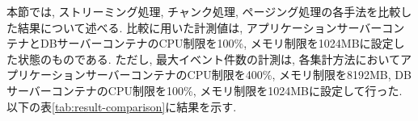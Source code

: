 \documentclass[../../main]{subfiles}
\begin{document}
    本節では, ストリーミング処理, チャンク処理, ページング処理の各手法を比較した結果について述べる. 比較に用いた計測値は, アプリケーションサーバーコンテナとDBサーバーコンテナのCPU制限を100\%, メモリ制限を1024MBに設定した状態のものである. ただし, 最大イベント件数の計測は, 各集計方法においてアプリケーションサーバーコンテナのCPU制限を400\%, メモリ制限を8192MB, DBサーバーコンテナのCPU制限を100\%, メモリ制限を1024MBに設定して行った. 以下の表\ref{tab:result-comparison}に結果を示す.

    

    \clearpage
\end{document}
